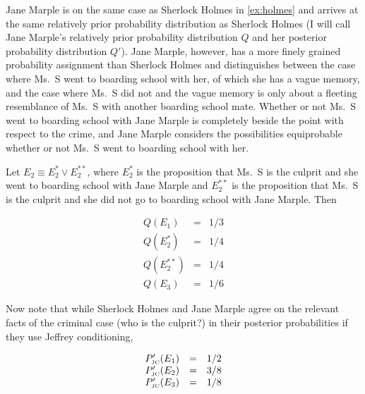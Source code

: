 \documentclass[12pt]{article}
\begin{document}
\begin{example}
  \label{ex:marple}
  Jane Marple is on the same case as Sherlock Holmes in {\xample}
  \ref{ex:holmes} and arrives at the same relatively prior probability
  distribution as Sherlock Holmes (I will call Jane Marple's
  relatively prior probability distribution $Q$ and her posterior
  probability distribution $Q'$). Jane Marple, however, has a more
  finely grained probability assignment than Sherlock Holmes and
  distinguishes between the case where Ms.\ S went to boarding school
  with her, of which she has a vague memory, and the case where Ms.\ S
  did not and the vague memory is only about a fleeting resemblance of
  Ms.\ S with another boarding school mate. Whether or not Ms.\ S went
  to boarding school with Jane Marple is completely beside the point
  with respect to the crime, and Jane Marple considers the
  possibilities equiprobable whether or not Ms.\ S went to boarding
  school with her.
\end{example}

Let $E_{2}\equiv{}E_{2}^{*}\vee{}E_{2}^{**}$, where $E_{2}^{*}$ is the
proposition that Ms.\ S is the culprit and she went to boarding school
with Jane Marple and $E_{2}^{**}$ is the proposition that Ms.\ S is
the culprit and she did not go to boarding school with Jane Marple.
Then

\begin{equation}
  \label{eq:marpleprior}
  \begin{array}{rcl}
  Q(E_{1})&=&1/3\\
  Q(E_{2}^{*})&=&1/4\\
  Q(E_{2}^{**})&=&1/4\\
  Q(E_{3})&=&1/6
\end{array}
\end{equation}

Now note that while Sherlock Holmes and Jane Marple agree on the
relevant facts of the criminal case (who is the culprit?) in their
posterior probabilities if they use Jeffrey conditioning,

\begin{equation}
  \label{eq:sherlockposteriorjc}
  \begin{array}{rcl}
  P'_{\mbox{\tiny JC}}(E_{1})&=&1/2\\
  P'_{\mbox{\tiny JC}}(E_{2})&=&3/8\\
  P'_{\mbox{\tiny JC}}(E_{3})&=&1/8
\end{array}
\end{equation}
\end{document}
